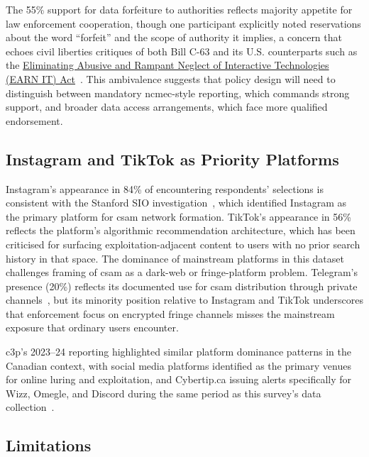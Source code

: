 \documentclass{ieee-portfolio}
\begin{document}
The 55\% support for data forfeiture to authorities reflects majority appetite for law enforcement cooperation, though one participant explicitly noted reservations about the word ``forfeit'' and the scope of authority it implies, a concern that echoes civil liberties critiques of both Bill C-63 and its U.S. counterparts such as the \href{https://congress.gov/bill/117th-congress/senate-bill/3538}{Eliminating Abusive and
Rampant Neglect of Interactive Technologies (EARN IT) Act}~\cite{us_protecting_2023}. This ambivalence suggests that policy design will need to distinguish between mandatory \gls{ncmec}-style reporting, which commands strong support, and broader data access arrangements, which face more qualified endorsement.
 
\subsection{Instagram and TikTok as Priority Platforms}
 
Instagram's appearance in 84\% of encountering respondents' selections is consistent with the Stanford SIO investigation~\cite{diresta_investigation_2023}, which identified Instagram as the primary platform for \gls{csam} network formation. TikTok's appearance in 56\% reflects the platform's algorithmic recommendation architecture, which has been criticised for surfacing exploitation-adjacent content to users with no prior search history in that space. The dominance of mainstream platforms in this dataset challenges framing of \gls{csam} as a dark-web or fringe-platform problem. Telegram's presence (20\%) reflects its documented use for \gls{csam} distribution through private channels~\cite{bleakley_moderating_2023}, but its minority position relative to Instagram and TikTok underscores that enforcement focus on encrypted fringe channels misses the mainstream exposure that ordinary users encounter.
 
\gls{c3p}'s 2023--24 reporting highlighted similar platform dominance patterns in the Canadian context, with social media platforms identified as the primary venues for online luring and exploitation, and Cybertip.ca issuing alerts specifically for Wizz, Omegle, and Discord during the same period as this survey's data collection~\cite{c3p_2023}.
 
\subsection{Limitations}
 
\end{document}
